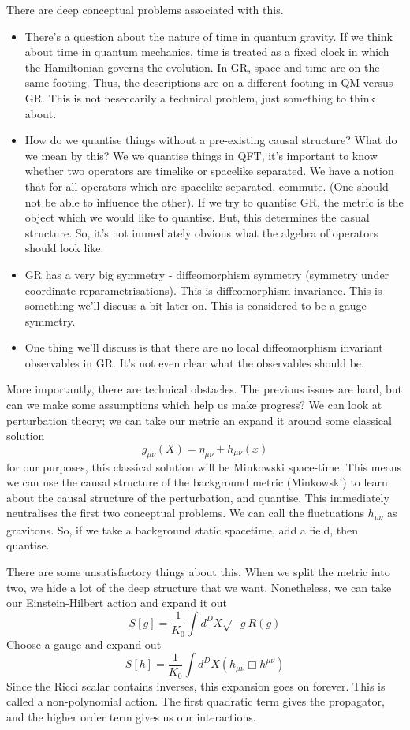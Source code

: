 \documentclass[11pt, oneside]{article}   	%
\theoremstyle{slanted}
\begin{document}
There are deep conceptual problems associated with this. 
\begin{itemize}
	\item  There's a question about the 
		nature of time in quantum gravity. 
	If we think about time in quantum mechanics, time 
	is treated as a fixed clock in which the Hamiltonian 
	governs the evolution. In GR, space and time are on the same footing. 
	Thus, the descriptions are on a different footing 
	in QM versus GR. This is not neseccarily a technical problem, 
	just something to think about. 
\item How do we quantise things without a pre-existing causal structure? 
	What do we mean by this? We we quantise things in QFT, 
	it's important to know whether two operators 
	are timelike or spacelike separated. We have a notion 
	that for all operators which are spacelike separated, 
	commute. (One should not be able to influence the other). 
	If we try to quantise GR, the metric is the object which 
	we would like to quantise. But, this determines the casual 
	structure. So, it's not immediately obvious 
	what the algebra of operators should look like. 

\item GR has a very big symmetry - diffeomorphism symmetry (symmetry under
	coordinate reparametrisations). This is diffeomorphism 
	invariance. This is something we'll discuss a bit later on. 
	This is considered to be a gauge symmetry. 
\item One thing we'll discuss is that there are no local 
	diffeomorphism invariant observables in GR. It's 
	not even clear what the observables should be. 
\end{itemize}

More importantly, 
there are technical obstacles. The previous issues are hard, 
but can we make some assumptions which help us make progress? 
We can look at perturbation theory; we can take our 
metric an expand it around some classical solution
\[
	g _{ \mu \nu } \left( X  \right)   = \eta _{ \mu \nu } + h _{ \mu \nu } \left( x \right) 
\] for our purposes, this classical solution will be 
Minkowski space-time. 
This means we can use the causal structure of 
the background metric (Minkowski) to 
learn about the causal structure of the perturbation, 
and quantise. 
This immediately neutralises the first two 
conceptual problems. We can call the fluctuations $ h _{ \mu \nu } $ 
as gravitons. 
So, if we take a background static spacetime, add a field, 
then quantise. 

There are some unsatisfactory things about this. 
When we split the metric into two, 
we hide a lot of the deep structure that we want. 
Nonetheless, we can take our Einstein-Hilbert action and expand it out
\[
	S \left[ g  \right]   = \frac{1}{K_ 0 } \int d ^{ D } X \sqrt{  - g }  R ( g ) 
\] Choose a gauge and expand out 
\[
	S \left[  h  \right]   = \frac{1}{K_0 } \int  d ^ D X \left( 
	h _{ \mu \nu } \Box h ^{ \mu \nu } \right) 
\] Since the Ricci scalar contains inverses, 
this expansion goes on forever. This is called 
a non-polynomial action. 
The first quadratic term gives the propagator, 
and the higher order term gives us our interactions. 
\end{document}
